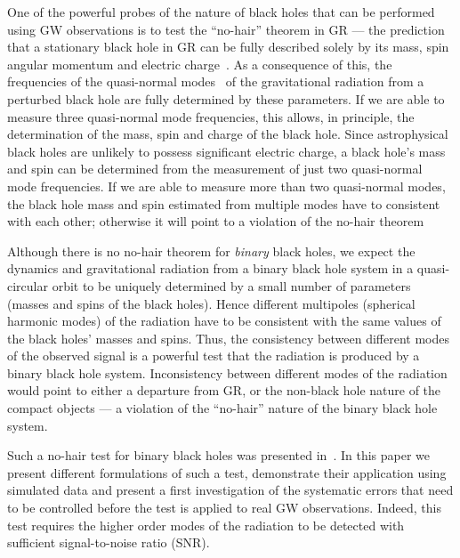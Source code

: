 \documentclass[prd,preprintnumbers,twocolumn,eqsecnum,floatfix,a4paper,nofootinbib,superscriptaddress]{revtex4}
\begin{document}
One of the powerful probes of the nature of black holes that can be performed using GW observations is to test the ``no-hair'' theorem in GR --- the prediction that a stationary black hole in GR can be fully described solely by its mass, spin angular momentum and electric charge~\cite{Israel:1967,Israel:1968,Carter:1978}. As a consequence of this, the frequencies of the {quasi-normal modes}~\cite{Vishveshwara:1970zz,Press:1971wr,Chandrasekhar:1975zza} of the gravitational radiation from a perturbed black hole are fully determined by these parameters. If we are able to measure three quasi-normal mode frequencies, this allows, in principle, the determination of the mass, spin and charge of the black hole. Since astrophysical black holes are unlikely to possess significant electric charge, a black hole's mass and spin can be determined from the measurement of just two quasi-normal mode frequencies. If we are able to measure more than two quasi-normal modes, the black hole mass and spin estimated from multiple modes have to consistent with each other; otherwise it will point to a violation of the no-hair theorem~\cite{Dreyer:2003bv}

Although there is no no-hair theorem for \emph{binary} black holes, we expect the dynamics and gravitational radiation from a binary black hole system in a quasi-circular orbit to be uniquely determined by a small number of parameters (masses and spins of the black holes). Hence different multipoles (spherical harmonic modes) of the radiation have to be consistent with the same values of the black holes' masses and spins. Thus, the consistency between different modes of the observed signal is a powerful test that the radiation is produced by a binary black hole system. Inconsistency between different modes of the radiation would point to either a departure from GR, or the non-black hole nature of the compact objects --- a violation of the ``no-hair'' nature of the binary black hole system. 

Such a no-hair test for binary black holes was presented in~\cite{Dhanpal:2018ufk}. In this paper we present different formulations of such a test, demonstrate their application using simulated data and present a first investigation of the systematic errors that need to be controlled before the test is applied to real GW observations. Indeed, this test requires the higher order modes of the radiation to be detected with sufficient signal-to-noise ratio (SNR). 
\end{document}
